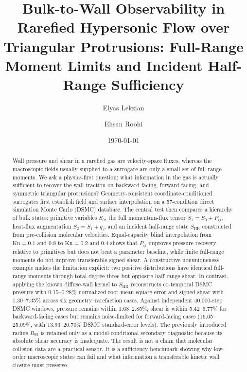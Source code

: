 \documentclass[aip,pof,preprint,floatfix,amsmath,amssymb]{revtex4-2}
\newcommand{\Kn}{\mathrm{Kn}}
\begin{document}
\title{Bulk-to-Wall Observability in Rarefied Hypersonic Flow over Triangular Protrusions: Full-Range Moment Limits and Incident Half-Range Sufficiency}

\author{Elyas Lekzian}

\author{Ehsan Roohi}

\date{\today}

\begin{abstract}
Wall pressure and shear in a rarefied gas are velocity-space fluxes, whereas the macroscopic fields usually supplied to a surrogate are only a small set of full-range moments. We ask a physics-first question: what information in the gas is actually sufficient to recover the wall traction on backward-facing, forward-facing, and symmetric triangular protrusions? Geometry-consistent coordinate-conditioned surrogates first establish field and surface interpolation on a 57-condition direct simulation Monte Carlo (DSMC) database. The central test then compares a hierarchy of bulk states: primitive variables $S_0$, the full momentum-flux tensor $S_1=S_0+P_{ij}$, heat-flux augmentation $S_2=S_1+q_i$, and an incident half-range state $S_{\mathrm{HR}}$ constructed from pre-collision molecular velocities. Equal-capacity blind interpolation from $\Kn=0.1$ and 0.8 to $\Kn=0.2$ and 0.4 shows that $P_{ij}$ improves pressure recovery relative to primitives but does not beat a parameter baseline, while finite full-range moments do not improve transferable signed shear. A constructive nonuniqueness example makes the limitation explicit: two positive distributions have identical full-range moments through total degree three but opposite half-range shear. In contrast, applying the known diffuse-wall kernel to $S_{\mathrm{HR}}$ reconstructs co-temporal DSMC pressure with 0.15--0.28\% normalized root-mean-square error and signed shear with 1.30--7.35\% across six geometry--rarefaction cases. Against independent 40,000-step DSMC windows, pressure remains within 1.68--2.85\%; shear is within 5.42--6.77\% for backward-facing cases but remains noise-limited for forward-facing cases (16.65--25.09\%, with 13.93--20.70\% DSMC standard-error levels). The previously introduced radius $R_{95}$ is retained only as a model-conditional secondary diagnostic because its absolute shear accuracy is inadequate. The result is not a claim that molecular collision data are a practical sensor. It is a sufficiency benchmark showing why low-order macroscopic states can fail and what information a transferable kinetic wall closure must preserve.
\end{abstract}
\end{document}
